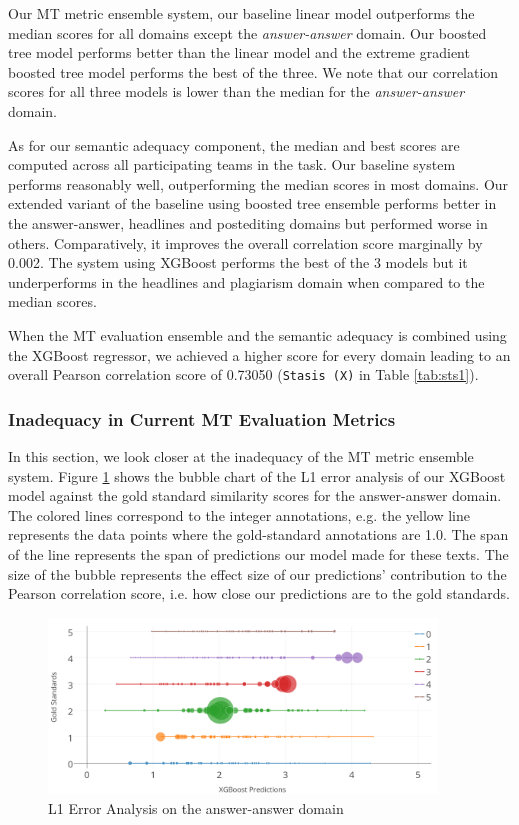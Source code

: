Our MT metric ensemble system, our baseline linear model outperforms the median scores for all domains except the \emph{answer-answer} domain. Our boosted tree model performs better than the linear model and the extreme gradient boosted tree model performs the best of the three. We note that our correlation scores for all three models is lower than the median for the \emph{answer-answer} domain. 

As for our semantic adequacy component, the median and best scores are computed across all participating teams in the task. Our baseline system performs reasonably well, outperforming the median scores in most domains. Our extended variant of the baseline using boosted tree ensemble performs better in the answer-answer, headlines and postediting domains but performed worse in others. Comparatively, it improves the overall correlation score marginally by 0.002. The system using XGBoost performs the best of the 3 models but it underperforms in the headlines and plagiarism domain when compared to the median scores. 

When the MT evaluation ensemble and the semantic adequacy is combined using the XGBoost regressor, we achieved a higher score for every domain leading to an overall Pearson correlation score of 0.73050 ({\tt Stasis (X)} in Table \ref{tab:sts1}).

\subsubsection{Inadequacy in Current MT Evaluation Metrics}

In this section, we look closer at the inadequacy of the MT metric ensemble system. Figure \ref{fig:sts1} shows the bubble chart of the L1 error analysis of our XGBoost model against the gold standard similarity scores for the answer-answer domain. The colored lines correspond to the integer annotations, e.g. the yellow line represents the data points where the gold-standard annotations are 1.0. The span of the line represents the span of predictions our model made for these texts. The size of the bubble represents the effect size of our predictions' contribution to the Pearson correlation score, i.e. how close our predictions are to the gold standards.

\begin{figure}[!htb]
    \centering
    \includegraphics[width=0.92\textwidth]{images/saar-sheff-ans-ans}
    \caption{L1 Error Analysis on the answer-answer domain}
    \label{fig:sts1}
\end{figure}

